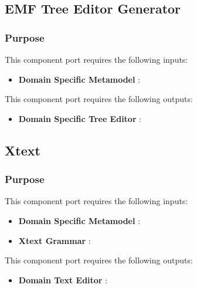 \documentclass{gemoc} %
\begin{document}
\subsection{EMF Tree Editor Generator}


\subsubsection{Purpose}

This component port requires the following inputs:
\begin{itemize}
  \item \textbf{Domain Specific Metamodel} :
\end{itemize}

This component port requires the following outputs:
\begin{itemize}
  \item \textbf{Domain Specific Tree Editor} :
\end{itemize}

\subsection{Xtext}


\subsubsection{Purpose}

This component port requires the following inputs:
\begin{itemize}
  \item \textbf{Domain Specific Metamodel} :
  \item \textbf{Xtext Grammar} :
\end{itemize}

This component port requires the following outputs:
\begin{itemize}
  \item \textbf{Domain Text Editor} :
\end{itemize}
\end{document}
